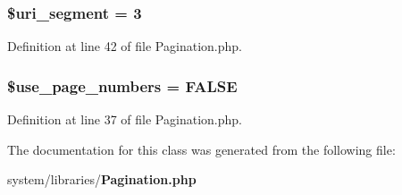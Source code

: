 \subsubsection[{\$uri\-\_\-segment}]{\setlength{\rightskip}{0pt plus 5cm}\$uri\-\_\-segment = 3}\label{class_c_i___pagination_a79fd9718cc6c432f6919c28299584d77}


Definition at line 42 of file Pagination.\-php.

\subsubsection[{\$use\-\_\-page\-\_\-numbers}]{\setlength{\rightskip}{0pt plus 5cm}\$use\-\_\-page\-\_\-numbers = F\-A\-L\-S\-E}\label{class_c_i___pagination_ac19b7d290389a9188ca6466f85d14a85}


Definition at line 37 of file Pagination.\-php.



The documentation for this class was generated from the following file\-:\begin{DoxyCompactItemize}
\item 
system/libraries/{\bf Pagination.\-php}\end{DoxyCompactItemize}

